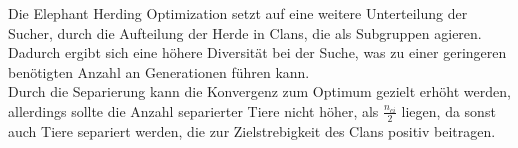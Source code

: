 Die Elephant Herding Optimization setzt auf eine weitere Unterteilung der Sucher, durch die Aufteilung der Herde in Clans, die als Subgruppen agieren. Dadurch ergibt sich eine höhere Diversität bei der Suche, was zu einer geringeren benötigten Anzahl an Generationen führen kann.\\
Durch die Separierung kann die Konvergenz zum Optimum gezielt erhöht werden, allerdings sollte die Anzahl separierter Tiere nicht höher, als $\frac{n_{ci}}{2}$ liegen, da sonst auch Tiere separiert werden, die zur Zielstrebigkeit des Clans positiv beitragen.  